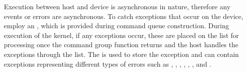 \documentclass[letterpaper,10pt,english]{sphinxmanual}
\begin{document}
Execution between host and device is asynchronous in nature, therefore
any events or errors are asynchronous. To catch exceptions that occur on
the device, employ an , which is provided during
command queue construction. During execution of the kernel, if any
exceptions occur, these are placed on the  list for
processing once the command group function returns and the host handles
the exceptions through the  list. The
 is used to store the exception and can contain
exceptions representing different types of errors such as
, ,
, ,
, , and .

\begin{fulllineitems}
\label{\detokenize{programming-interface/error-handling/exception:_CPPv413async_handler}}%
\pysigstartmultiline
{}%
\pysigstopmultiline
\end{fulllineitems}

\end{document}
